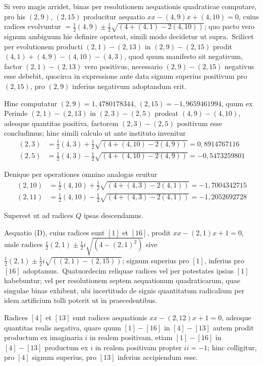 \documentclass[12pt,a4paper]{article}
\theoremstyle{plain}
\theoremstyle{definition}
\theoremstyle{remark}
\begin{document}
Si vero magis arridet, binas per resolutionem aequationis quadraticae
computare, pro his $(2,9)$, $(2,15)$ producitur aequatio
$xx-(4,9)x+(4,10)=0$, cuius radices evolvuntur
$=\frac{1}{2}(4,9)\pm\frac{1}{2}\sqrt{(4+(4,1)-2(4,10))}$; quo pacto vero signum
ambiguum hie definire oporteat, simili modo decidetur ut supra.\ Scilicet
per evolutionem producti $(2,1)-(2,13)$ in $(2,9)-(2,15)$ prodit
$(4,1)+(4,9)-(4,10)-(4,3)$, quod quum manifesto sit negativum,
factor $(2,1)-(2,13)$ vero positivus, necessario $(2,9)-(2,15)$
negativus esse debebit, quocirca in expressione ante data signum superius
positivum pro $(2,15)$, pro $(2,9)$ inferius negativum adoptandum erit.

Hinc computatur $(2,9)=1,4780178344$, $(2,15)=-1,9659461994$,
quum ex Perinde $(2,1)-(2,13)$ in $(2,3)-(2,5)$ prodeat
$(4,9)-(4,10)$, adeoque quantitas positiva, factorem $(2,3)-(2,5)$
positivum esse concludimus; hinc simili calculo ut ante instituto invenitur
\begin{align*}
(2,3) &= \tfrac{1}{2}(4,3)+\tfrac{1}{2}\sqrt{(4+(4,10)-2(4,9))} = 0,8914767116 \\
(2,5) &= \tfrac{1}{2}(4,3)-\tfrac{1}{2}\sqrt{(4+(4,10)-2(4,9))} = -0,5473259801
\end{align*}

Denique per operationes omnino analogas eruitur
\begin{align*}
(2,10) &= \tfrac{1}{2}(4,10)+\tfrac{1}{2}\sqrt{(4+(4,3)-2(4,1))} = -1,7004342715 \\
(2,11) &= \tfrac{1}{2}(4,10)-\tfrac{1}{2}\sqrt{(4+(4,3)-2(4,1))} = -1,2052692728
\end{align*}

Superest ut ad radices $Q$ ipsas descendamus.

Aequatio (D), cuius radices sunt $[1]$ et $[16]$, prodit
$xx-(2,1)x+1=0$, unde radices $\frac{1}{2}(2,1)\pm\frac{1}{2}i\sqrt{(4-(2,1)^2)}$
sive $\frac{1}{2}(2,1)\pm\frac{1}{2}i\sqrt{((2,1)-(2,15))}$; signum superius pro $[1]$,
inferius pro $[16]$ adoptamus.\ Quatuordecim reliquae radices vel per
potestates ipsius $[1]$ habebuntur; vel per resolutionem septem aequationum
quadraticarum, quae singulae binas exhibent, ubi incertitudo de signis
quantitatum radicalium per idem artificium tolli poterit ut in praecedentibus.

Radices $[4]$ et $[13]$ sunt radices aequationis $xx-(2,12)x+1=0$,
adeoque quantitas realis negativa, quare quum $[1]-[16]$ in $[4]-[13]$
autem prodit productum ex imaginaria $i$ in realem positivam, etiam
$[1]-[16]$ in $[4]-[13]$ productum ex $i$ in realem positivam propter
$ii=-1$; hinc colligitur, pro $[4]$ signum superius, pro $[13]$ inferius
accipiendum esse.
\end{document}
